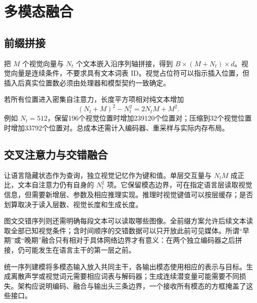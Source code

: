 \documentclass[../textbook.tex]{subfiles}
\begin{document}
\section{多模态融合}

\subsection{前缀拼接}
把 $M$ 个视觉向量与 $N_t$ 个文本嵌入沿序列轴拼接，得到 $B\times(M+N_t)\times d$。视觉向量是连续条件，不要求具有文本词表 ID。视觉占位符可以指示插入位置，但插入后真实位置数必须由处理器和模型契约一致确定。

若所有位置进入密集自注意力，长度平方项相对纯文本增加
\begin{equation}
 (N_t+M)^2-N_t^2=2N_tM+M^2.
\end{equation}
例如 $N_t=512$，保留196个视觉位置时增加239120个位置对；压缩到32个视觉位置时增加33792个位置对。总成本还需计入编码器、重采样与实际内存布局。

\subsection{交叉注意力与交错融合}
让语言隐藏状态作为查询，独立视觉记忆作为键和值。单层交互量与 $N_tM$ 成正比，文本自注意力仍有自身的 $N_t^2$ 项。它保留模态边界，可在指定语言层读取视觉信息，但需要新增层、参数及相应推理实现。推理时视觉键值可以按层缓存；是否划算取决于读入层数、视觉长度和生成长度。

图文交错序列则还需明确每段文本可以读取哪些图像。全前缀方案允许后续文本读取全部已知视觉条件；含时间顺序的交错数据可以只开放此前可见媒体。所谓“早期”或“晚期”融合只有相对于具体网络边界才有意义：在两个独立编码器之后拼接，仍可能发生在语言主干的第一层之前。

统一序列建模将多模态输入放入共同主干，各输出模态使用相应的表示与目标。生成离散声学或视觉词元需要相应词表与解码器；生成连续潜变量可能需要不同损失。架构应说明编码、融合与输出头三条边界，一个接收所有模态的方框掩盖了这些接口。
\end{document}

